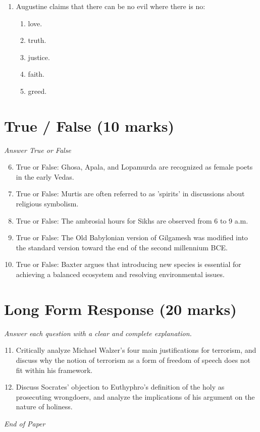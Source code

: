 \documentclass[12pt]{article}
\begin{document}
\begin{enumerate}[label=\arabic*.]
\begin{enumerate}[label=(\alph*)]
    \item Communitarianism.
    \item Anarchist cosmopolitanism.
\end{enumerate}
\item Augustine claims that there can be no evil where there is no:
\begin{enumerate}[label=(\alph*)]
    \item love.
    \item truth.
    \item justice.
    \item faith.
    \item greed.
\end{enumerate}
\end{enumerate}

\section*{True / False (10 marks)}
\textit{Answer True or False}
\begin{enumerate}[label=\arabic*.]
\setcounter{enumi}{5}
\item True or False: Ghosa, Apala, and Lopamurda are recognized as female poets in the early Vedas.
\item True or False: Murtis are often referred to as 'spirits' in discussions about religious symbolism.
\item True or False: The ambrosial hours for Sikhs are observed from 6 to 9 a.m.
\item True or False: The Old Babylonian version of Gilgamesh was modified into the standard version toward the end of the second millennium BCE.
\item True or False: Baxter argues that introducing new species is essential for achieving a balanced ecosystem and resolving environmental issues.
\end{enumerate}

\section*{Long Form Response (20 marks)}
\textit{Answer each question with a clear and complete explanation.}
\begin{enumerate}[label=\arabic*.]
\setcounter{enumi}{10}
\item Critically analyze Michael Walzer's four main justifications for terrorism, and discuss why the notion of terrorism as a form of freedom of speech does not fit within his framework.
\item Discuss Socrates' objection to Euthyphro's definition of the holy as prosecuting wrongdoers, and analyze the implications of his argument on the nature of holiness.
\end{enumerate}

\vfill
\noindent\textit{End of Paper}
\end{document}
